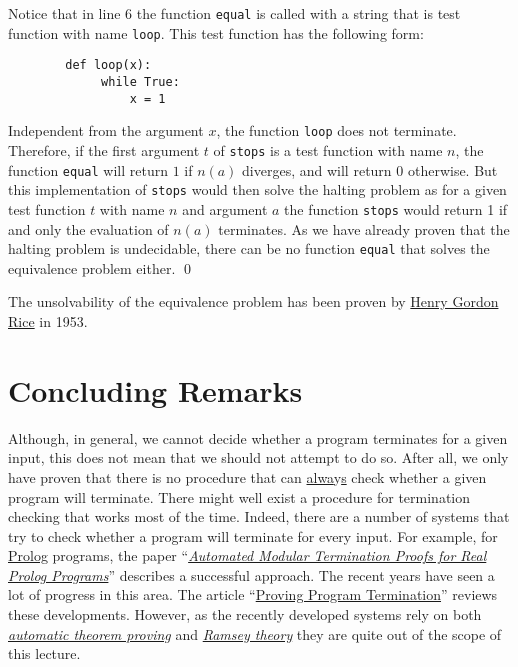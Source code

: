 Notice that in line 6 the function \texttt{equal} is called with a string that is test function with
name \texttt{loop}.  This test function has the following form:
\begin{verbatim}
        def loop(x): 
             while True:
                 x = 1
\end{verbatim}
Independent from the argument $x$, the function \texttt{loop} does not terminate.
Therefore, if the first argument $t$ of \texttt{stops} is a test function with name $n$, 
the function \texttt{equal} will return $1$ if $n(a)$ diverges, and will return $0$ otherwise.
But this implementation of \texttt{stops} would then solve the halting problem as
for a given test function $t$ with name $n$ and argument $a$ the function \texttt{stops} would
return 1 if and only the evaluation of $n(a)$ terminates.  As we have already proven that the
halting problem is undecidable, there can be no function \texttt{equal} that solves the equivalence
problem either.
\qed

\remarkEng
The unsolvability of the equivalence problem has been proven by \href{http://en.wikipedia.org/wiki/Henry_Gordon_Rice}{Henry Gordon Rice} \cite{rice:1953} in 1953.
\eox

\section{Concluding Remarks}
Although, in general, we cannot decide whether a program terminates for a given input, this does not mean
that we should not attempt to do so.  After all, we only have proven that there is no procedure that
can \underline{alwa}y\underline{s} check whether a given program will terminate.  There might well exist a
procedure for termination checking that works most of the time.  Indeed, there are a number of
systems that try to check whether a program will terminate for every input.  For example, for
\href{https://en.wikipedia.org/wiki/Prolog}{Prolog}
programs, the paper
``\href{http://link.springer.com/chapter/10.1007%2F3-540-61739-6_44}{\emph{Automated Modular Termination Proofs for Real Prolog Programs}}''
\cite{mueller:1996} describes a successful approach.  The recent years have seen a lot of progress in
this area.  The article 
``\href{http://dl.acm.org/citation.cfm?id=1941509}{{Proving Program Termination}}''
\cite{cook:2011} reviews these developments.  However, as the recently developed systems rely on both
\href{http://en.wikipedia.org/wiki/Automated_theorem_proving}{\emph{automatic theorem proving}} and
\href{http://en.wikipedia.org/wiki/Ramsey_theory}{\emph{Ramsey theory}} they are quite out of the
scope of this lecture.
\pagebreak

